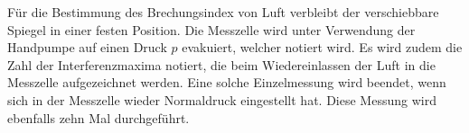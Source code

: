 Für die Bestimmung des Brechungsindex von Luft verbleibt der verschiebbare Spiegel in einer festen Position.
Die Messzelle wird unter Verwendung der Handpumpe auf einen Druck $p$ evakuiert, welcher notiert wird. Es wird zudem die Zahl 
der Interferenzmaxima notiert, die beim Wiedereinlassen der Luft in die Messzelle aufgezeichnet werden. 
Eine solche Einzelmessung wird beendet, wenn sich in der Messzelle wieder Normaldruck eingestellt hat. 
Diese Messung wird ebenfalls zehn Mal durchgeführt. 